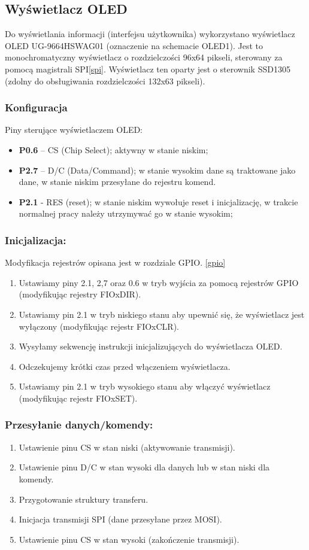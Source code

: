 \subsection{Wyświetlacz OLED}

Do wyświetlania informacji (interfejsu użytkownika) wykorzystano wyświetlacz OLED UG-9664HSWAG01 (oznaczenie na schemacie OLED1). Jest to monochromatyczny wyświetlacz o rozdzielczości 96x64 pikseli, sterowany za pomocą magistrali SPI\ref{spi}. Wyświetlacz ten oparty jest o sterownik SSD1305 (zdolny do obsługiwania rozdzielczości 132x63 pikseli).

\subsubsection{Konfiguracja}
Piny sterujące wyświetlaczem OLED:
\begin{itemize}
\item \textbf{P0.6} – CS (Chip Select); aktywny w stanie niskim;
\item \textbf{P2.7} – D/C (Data/Command); w stanie wysokim dane są traktowane jako dane, w stanie niskim przesyłane do rejestru komend.
\item \textbf{P2.1} - RES (reset); w stanie niskim wywołuje reset i inicjalizację, w trakcie normalnej pracy należy utrzymywać go w stanie wysokim;
\end{itemize}
\subsubsection {Inicjalizacja:}
Modyfikacja rejestrów opisana jest w rozdziale GPIO. \ref{gpio}
\begin{enumerate}
    \item Ustawiamy piny 2.1, 2,7 oraz 0.6 w tryb wyjścia za pomocą rejestrów GPIO (modyfikując rejestry FIOxDIR).
    \item Ustawiamy pin 2.1 w tryb niskiego stanu aby upewnić się, że wyświetlacz jest wyłączony (modyfikując rejestr FIOxCLR).
    \item Wysyłamy sekwencję instrukcji inicjalizujących do wyświetlacza OLED.
    \item Odczekujemy krótki czas przed włączeniem wyświetlacza.
    \item Ustawiamy pin 2.1 w tryb wysokiego stanu aby włączyć wyświetlacz (modyfikując rejestr FIOxSET).
\end{enumerate}
\subsubsection {Przesyłanie danych/komendy:}
\label{przes}
\begin{enumerate}
    \item Ustawienie pinu CS w stan niski (aktywowanie transmisji).
    \item Ustawienie pinu D/C w stan wysoki dla danych lub w stan niski dla komendy.
    \item Przygotowanie struktury transferu.
    \item Inicjacja transmisji SPI (dane przesyłane przez MOSI). 
    \item Ustawienie pinu CS w stan wysoki (zakończenie transmisji).
\end{enumerate}

